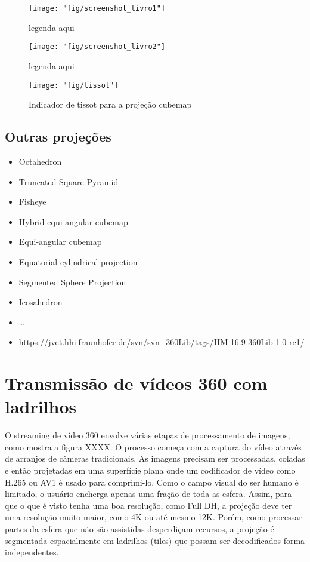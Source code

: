 \begin{figure}[tbh]
	\centering
	\texttt{[image: "fig/screenshot\_livro1"]}
	\caption{legenda aqui}
	\label{fig:screenshot_livro1}
\end{figure}

\begin{figure}[tbh]
	\centering
	\texttt{[image: "fig/screenshot\_livro2"]}
	\caption{legenda aqui}
	\label{fig:screenshot_livro2}
\end{figure}

\begin{figure}[tbh]
	\centering
	\texttt{[image: "fig/tissot"]}
	\caption{Indicador de tissot para a projeção cubemap}
	\label{fig:tissot}
\end{figure}

\subsection{Outras projeções}

\begin{itemize}
	\item Octahedron
	\item Truncated Square Pyramid
	\item Fisheye
	\item Hybrid equi-angular cubemap
	\item Equi-angular cubemap
	\item Equatorial cylindrical projection
	\item Segmented Sphere Projection
	\item Icosahedron
	\item …
	\item \url{https://jvet.hhi.fraunhofer.de/svn/svn_360Lib/tags/HM-16.9-360Lib-1.0-rc1/}
\end{itemize}

\section{Transmissão de vídeos 360 com ladrilhos}

O streaming de vídeo 360 envolve várias etapas de processamento de imagens, como mostra a figura XXXX. O processo começa com a captura do vídeo através de arranjos de câmeras tradicionais. As imagens precisam ser processadas, coladas e então projetadas em uma superfície plana onde um codificador de vídeo como H.265 ou AV1 é usado para comprimi-lo. Como o campo visual do ser humano é limitado, o usuário encherga apenas uma fração de toda as esfera. Assim, para que o que é visto tenha uma boa resolução, como Full DH, a projeção deve ter uma resolução muito maior, como 4K ou até mesmo 12K. Porém, como processar partes da esfera que não são assistidas desperdiçam recursos, a projeção é segmentada espacialmente em ladrilhos (tiles) que possam ser decodificados forma independentes.

